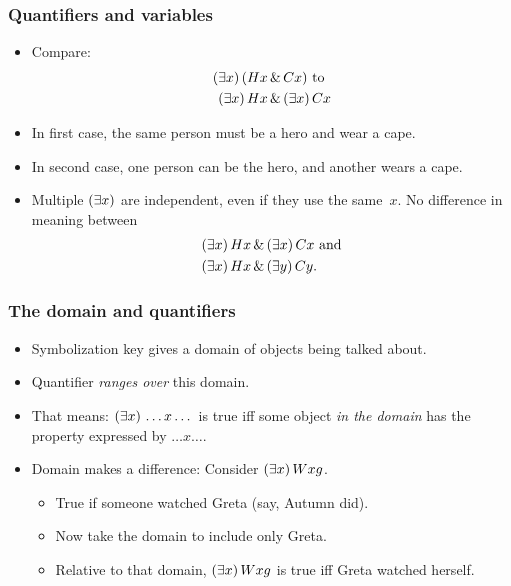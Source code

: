 \begin{frame}
\frametitle{Quantifiers and variables}

  \begin{itemize}[<+->]
    \item Compare:
    \begin{align*}
    (\exists x)\,(Hx & \,\&\, Cx) \text{ to }\\
    (\exists x) \, Hx &\,\&\, (\exists x)\, Cx
    \end{align*}
    \item In first case, the same person must be a hero and wear a cape.
    \item In second case, one person can be the hero, and another wears a cape.
    \item Multiple $(\exists x)$ are independent, even if they use
    the same~$x$. No difference in meaning between
    \begin{align*}
     & (\exists x) \, Hx \,\&\, (\exists x)\, Cx \text{ and}\\
     & (\exists x) \, Hx \,\&\, (\exists y)\, Cy.
    \end{align*}
  \end{itemize}
\end{frame}

\begin{frame}
\frametitle{The domain and quantifiers}

\begin{itemize}[<+->]
  \item Symbolization key gives a domain of objects being talked about.
  \item Quantifier \emph{ranges over} this domain.
  \item That means: $(\exists x)\, \dots x \dots$ is true iff some object
  \emph{in the domain} has the property expressed by $\dots x \dots$.
  \item Domain makes a difference: Consider $(\exists x)\, Wxg$.
  \begin{itemize}
    \item True if someone watched Greta (say, Autumn did).
    \item Now take the domain to include only Greta.
    \item Relative to that domain, $(\exists x)\, Wxg$ is true iff
    Greta watched herself.
  \end{itemize}
\end{itemize}
\end{frame}

